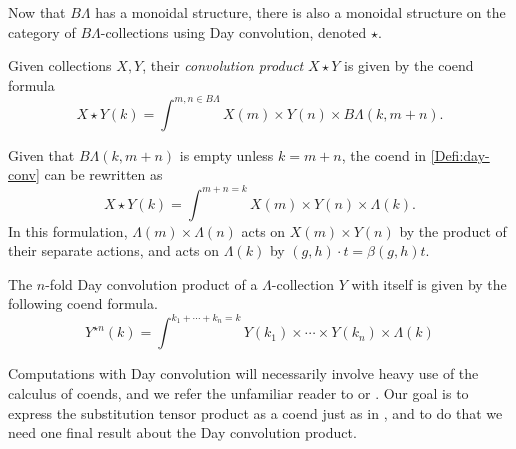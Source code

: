 Now that $B\Lambda$ has a monoidal structure, there is also a monoidal structure on the category of $B\Lambda$-collections using Day convolution, denoted $\star$. 

\begin{Defi}\label{Defi:day-conv}
Given collections $X, Y$, their \emph{convolution product} $X \star Y$ is given by the coend formula
  \[
    X \star Y (k) = \int^{m,n \in B\Lambda} X(m) \times Y(n) \times B\Lambda(k, m+n).
  \]
  \end{Defi}
  
\begin{rem}\label{rem:DC-simple}
Given that $  B\Lambda(k, m+n)$ is empty unless $k=m+n$, the coend in \cref{Defi:day-conv} can be rewritten as
  \[
    X \star Y (k) = \int^{m+n=k} X(m) \times Y(n) \times \Lambda(k).
  \]
In this formulation, $\Lambda(m) \times \Lambda(n)$ acts on $X(m) \times Y(n)$ by the product of their separate actions, and acts on $\Lambda(k)$ by $(g, h) \cdot t = \beta(g,h) t$.
\end{rem}
  
\begin{rem}\label{rem:nfold-DC}
The $n$-fold Day convolution product of a $\Lambda$-collection $Y$ with itself is given by the following coend formula.
  \[
    Y^{\star n}(k) = \int^{k_{1}+ \cdots + k_{n}=k } Y(k_{1}) \times \cdots \times Y(k_{n}) \times \Lambda(k)
  \]
  \end{rem}
  
Computations with Day convolution will necessarily involve heavy use of the calculus of coends, and we refer the unfamiliar reader to \cite{maclane-catwork} or \cite{loregian}. 
Our goal is to express the substitution tensor product as a coend just as in \cite{kelly-op}, and to do that we need one final result about the Day convolution product.

